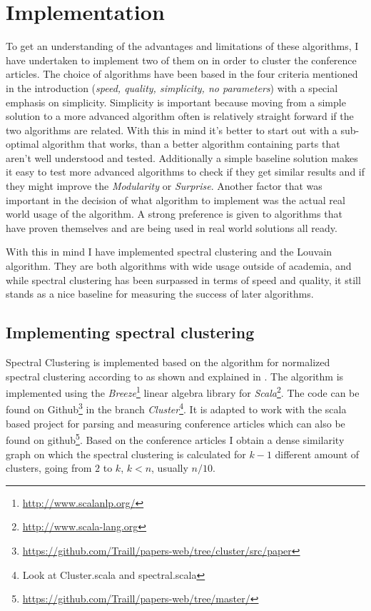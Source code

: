 \section{Implementation}
To get an understanding of the advantages and limitations of these 
algorithms, I have undertaken to implement two of them on in order to 
cluster the conference articles. The choice of algorithms have been 
based in the four criteria mentioned in the introduction (\emph{speed, 
quality, simplicity, no parameters}) with a special emphasis on 
simplicity. Simplicity is important because moving from a simple 
solution to a more advanced algorithm often is relatively straight 
forward if the two algorithms are related. With this in mind it's better 
to start out with a sub-optimal algorithm that works, than a better 
algorithm containing parts that aren't well understood and tested.  
Additionally a simple baseline solution makes it easy to test more 
advanced algorithms to check if they get similar results and if they 
might improve the \emph{Modularity} or \emph{Surprise}. Another factor 
that was important in the decision of what algorithm to implement was 
the actual real world usage of the algorithm. A strong preference is 
given to algorithms that have proven themselves and are being used in 
real world solutions all ready.

With this in mind I have implemented spectral clustering and the Louvain 
algorithm. They are both algorithms with wide usage outside of 
academia, and while spectral clustering has been surpassed in terms of 
speed and quality, it still stands as a nice baseline for measuring the 
success of later algorithms.

\subsection{Implementing spectral clustering}

Spectral Clustering is implemented based on the algorithm for normalized 
spectral clustering according to \cite{ng2002} as shown and explained in 
\cite[p. 7]{von2007}. The algorithm is implemented using the 
\emph{Breeze}\footnote{\url{http://www.scalanlp.org/}} linear algebra 
library for \emph{Scala}\footnote{\url{http://www.scala-lang.org}}.
The code can be found on 
Github\footnote{\url{https://github.com/Traill/papers-web/tree/cluster/src/paper}} 
in the branch \emph{Cluster}\footnote{Look at Cluster.scala and 
spectral.scala}.  It is adapted to work with the scala based project for 
parsing and measuring conference articles which can also be found on 
github\footnote{\url{https://github.com/Traill/papers-web/tree/master/}}.  
Based on the conference articles I obtain a dense similarity graph on 
which the spectral clustering is calculated for $k-1$ different amount 
of clusters, going from $2$ to $k$, $k < n$, usually $n/10$.


